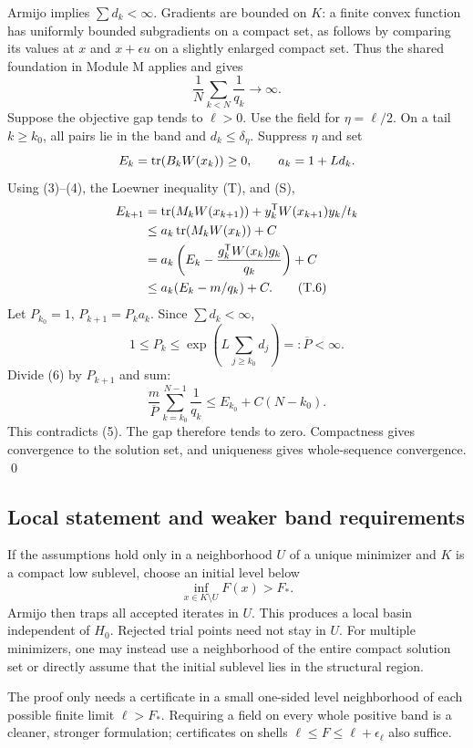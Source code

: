 Armijo implies $\sum d_k<\infty$. Gradients are bounded on $K$: a finite convex function has uniformly bounded subgradients on a compact set, as follows by comparing its values at $x$ and $x+\epsilon u$ on a slightly enlarged compact set. Thus the shared foundation in Module M applies and gives
\begin{equation}
 \frac1N\sum_{k<N}\frac1{q_k}\longrightarrow\infty. \tag{T.5}
\end{equation}
Suppose the objective gap tends to $\ell>0$. Use the field for $\eta=\ell/2$. On a tail $k\ge k_0$, all pairs lie in the band and $d_k\le\delta_\eta$. Suppress $\eta$ and set
\[
 E_k=\operatorname{tr}(B_kW(x_k))\ge0,\qquad a_k=1+L d_k.
\]
Using (3)--(4), the Loewner inequality (T), and (S),
\begin{align}
 E_{k+1}
 &=\operatorname{tr}(M_kW(x_{k+1}))+y_k^{\mathsf T} W(x_{k+1})y_k/t_k\notag\\
 &\le a_k\operatorname{tr}(M_kW(x_k))+C\notag\\
 &=a_k\left(E_k-\frac{g_k^{\mathsf T} W(x_k)g_k}{q_k}\right)+C\notag\\
 &\le a_k(E_k-m/q_k)+C. \tag{T.6}
\end{align}
Let $P_{k_0}=1$, $P_{k+1}=P_ka_k$. Since $\sum d_k<\infty$,
\[
 1\le P_k\le \exp\left(L\sum_{j\ge k_0}d_j\right)=:\overline P<\infty.
\]
Divide (6) by $P_{k+1}$ and sum:
\[
 \frac m{\overline P}\sum_{k=k_0}^{N-1}\frac1{q_k}
 \le E_{k_0}+C(N-k_0).
\]
This contradicts (5). The gap therefore tends to zero. Compactness gives convergence to the solution set, and uniqueness gives whole-sequence convergence. \qed

\subsection{Local statement and weaker band requirements}
If the assumptions hold only in a neighborhood $U$ of a unique minimizer and $K$ is a compact low sublevel, choose an initial level below
\[
 \inf_{x\in K\setminus U}F(x)>F_*.
\]
Armijo then traps all accepted iterates in $U$. This produces a local basin independent of $H_0$. Rejected trial points need not stay in $U$. For multiple minimizers, one may instead use a neighborhood of the entire compact solution set or directly assume that the initial sublevel lies in the structural region.

The proof only needs a certificate in a small one-sided level neighborhood of each possible finite limit $\ell>F_*$. Requiring a field on every whole positive band is a cleaner, stronger formulation; certificates on shells $\ell\le F\le\ell+\epsilon_\ell$ also suffice.

